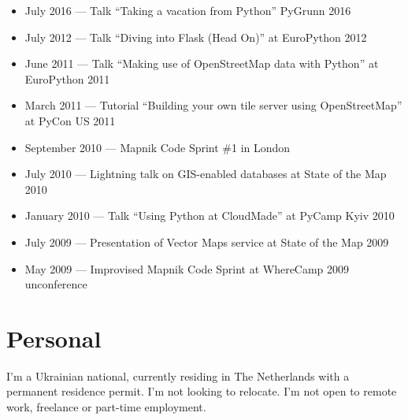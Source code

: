 \documentclass[margin]{res}
\begin{document}
\begin{resume}
\begin{itemize}
\item July 2016 --- Talk ``Taking a vacation from Python'' PyGrunn 2016
\item July 2012 --- Talk ``Diving into Flask (Head On)'' at EuroPython 2012
\item June 2011 --- Talk ``Making use of OpenStreetMap data with Python'' at EuroPython 2011
\item March 2011 --- Tutorial ``Building your own tile server using OpenStreetMap'' at PyCon US 2011
\item September 2010 --- Mapnik Code Sprint \#1 in London
\item July 2010 --- Lightning talk on GIS-enabled databases at State of the Map 2010
\item January 2010 --- Talk ``Using Python at CloudMade'' at PyCamp Kyiv 2010
\item July 2009 --- Presentation of Vector Maps service at State of the Map 2009
\item May 2009 --- Improvised Mapnik Code Sprint at WhereCamp 2009 unconference
\end{itemize}

\section{Personal}

I'm a Ukrainian national, currently residing in The Netherlands with a permanent residence permit. I'm not looking to relocate. I'm not open to remote work, freelance or part-time employment.

\end{resume}
\end{document}

